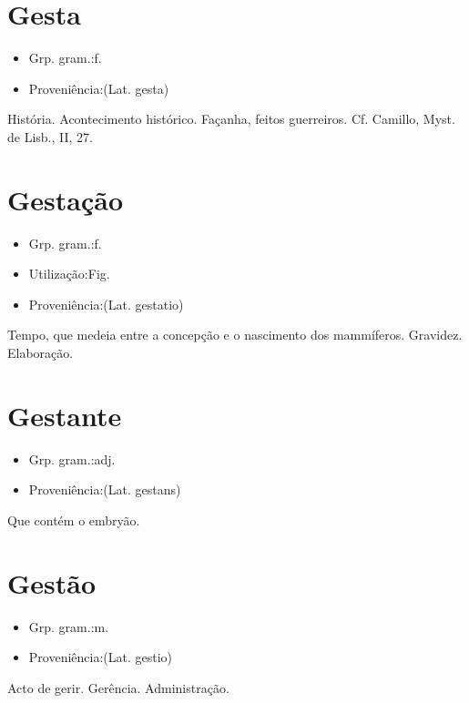 \section{Gesta}
\begin{itemize}
\item {Grp. gram.:f.}
\end{itemize}
\begin{itemize}
\item {Proveniência:(Lat. \textunderscore gesta\textunderscore )}
\end{itemize}
História.
Acontecimento histórico.
Façanha, feitos guerreiros. Cf. Camillo, \textunderscore Myst. de Lisb.\textunderscore , II, 27.
\section{Gestação}
\begin{itemize}
\item {Grp. gram.:f.}
\end{itemize}
\begin{itemize}
\item {Utilização:Fig.}
\end{itemize}
\begin{itemize}
\item {Proveniência:(Lat. \textunderscore gestatio\textunderscore )}
\end{itemize}
Tempo, que medeia entre a concepção e o nascimento dos mammíferos.
Gravidez.
Elaboração.
\section{Gestante}
\begin{itemize}
\item {Grp. gram.:adj.}
\end{itemize}
\begin{itemize}
\item {Proveniência:(Lat. \textunderscore gestans\textunderscore )}
\end{itemize}
Que contém o embryão.
\section{Gestão}
\begin{itemize}
\item {Grp. gram.:m.}
\end{itemize}
\begin{itemize}
\item {Proveniência:(Lat. \textunderscore gestio\textunderscore )}
\end{itemize}
Acto de gerir.
Gerência.
Administração.
